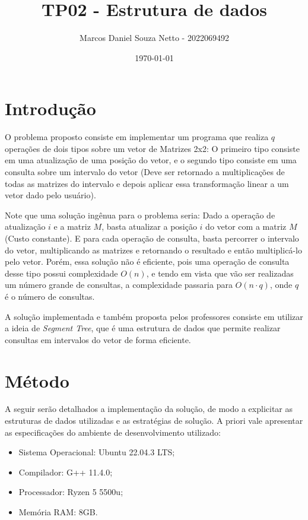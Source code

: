 \documentclass{article}
\title{TP02 - Estrutura de dados}
\author{Marcos Daniel Souza Netto - 2022069492}
\date{\today}
\begin{document}
\maketitle

\section{Introdução}

O problema proposto consiste em implementar um programa que realiza $q$ operações de dois tipos sobre um vetor de Matrizes 2x2: O primeiro tipo consiste em uma atualização de uma posição do vetor, e o segundo tipo consiste em uma consulta sobre um intervalo do vetor (Deve ser retornado a multiplicações de todas as matrizes do intervalo e depois aplicar essa transformação linear a um vetor dado pelo usuário).

Note que uma solução ingênua para o problema seria: Dado a operação de atualização $i$ e a matriz $M$, basta atualizar a posição $i$ do vetor com a matriz $M$ (Custo constante). E para cada operação de consulta, basta percorrer o intervalo do vetor, multiplicando as matrizes e retornando o resultado e então multiplicá-lo pelo vetor. 
Porém, essa solução não é eficiente, pois uma operação de consulta desse tipo possui complexidade $O(n)$, e tendo em vista que vão ser realizadas um número grande de consultas, a complexidade passaria para $O(n \cdot q)$, onde $q$ é o número de consultas.

A solução implementada e também proposta pelos professores consiste em utilizar a ideia de \emph{Segment Tree}, que é uma estrutura de dados que permite realizar consultas em intervalos do vetor de forma eficiente. 

\section{Método}

A seguir serão detalhados a implementação da solução, de modo a explicitar 
as estruturas de dados utilizadas e as estratégias de solução. A priori vale 
apresentar as especificações do ambiente de desenvolvimento utilizado:

\begin{itemize}
    \item Sistema Operacional: Ubuntu 22.04.3 LTS;
    \item Compilador: G++ 11.4.0;
    \item Processador: Ryzen 5 5500u;
    \item Memória RAM: 8GB.
\end{itemize}
\end{document}
